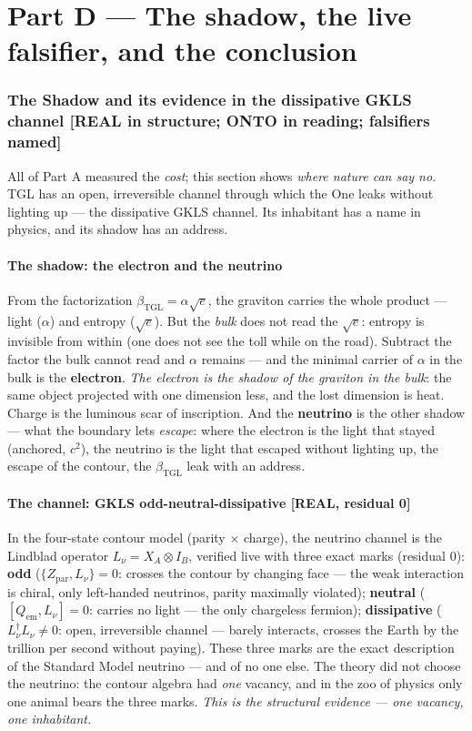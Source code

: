 \documentclass[11pt]{article}
\newcommand{\bTGL}{\beta_{\mathrm{TGL}}}\newcommand{\Msun}{M_{\odot}}\newcommand{\TGL}{\mathrm{TGL}}
\theoremstyle{definition}\newtheorem{deriv}{Derivation}
\begin{document}
\part{Part D --- The shadow, the live falsifier, and the conclusion}

\section{The Shadow and its evidence in the dissipative GKLS channel \textsf{[REAL in structure; ONTO in reading; falsifiers named]}}

All of Part A measured the \emph{cost}; this section shows \emph{where nature can say no}. TGL has an open, irreversible channel through which the One leaks without lighting up --- the dissipative GKLS channel. Its inhabitant has a name in physics, and its shadow has an address.

\subsection*{The shadow: the electron and the neutrino}

From the factorization $\bTGL=\alpha\sqrt e$, the graviton carries the whole product --- light ($\alpha$) and entropy ($\sqrt e$). But the \emph{bulk} does not read the $\sqrt e$: entropy is invisible from within (one does not see the toll while on the road). Subtract the factor the bulk cannot read and $\alpha$ remains --- and the minimal carrier of $\alpha$ in the bulk is the \textbf{electron}. \emph{The electron is the shadow of the graviton in the bulk}: the same object projected with one dimension less, and the lost dimension is heat. Charge is the luminous scar of inscription. And the \textbf{neutrino} is the other shadow --- what the boundary lets \emph{escape}: where the electron is the light that stayed (anchored, $c^2$), the neutrino is the light that escaped without lighting up, the escape of the contour, the $\bTGL$ leak with an address.

\subsection*{The channel: GKLS odd-neutral-dissipative \textsf{[REAL, residual 0]}}

In the four-state contour model (parity $\times$ charge), the neutrino channel is the Lindblad operator $L_\nu=X_A\otimes I_B$, verified live with three exact marks (residual $0$): \textbf{odd} ($\{Z_{\text{par}},L_\nu\}=0$: crosses the contour by changing face --- the weak interaction is chiral, only left-handed neutrinos, parity maximally violated); \textbf{neutral} ($[Q_{\text{em}},L_\nu]=0$: carries no light --- the only chargeless fermion); \textbf{dissipative} ($L_\nu^\dagger L_\nu\neq0$: open, irreversible channel --- barely interacts, crosses the Earth by the trillion per second without paying). These three marks are the exact description of the Standard Model neutrino --- and of no one else. The theory did not choose the neutrino: the contour algebra had \emph{one} vacancy, and in the zoo of physics only one animal bears the three marks. \emph{This is the structural evidence --- one vacancy, one inhabitant.}
\end{document}
